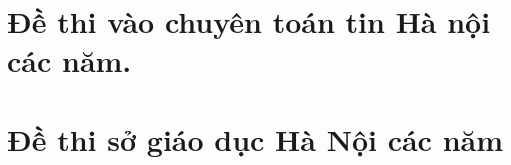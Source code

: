 \documentclass[12pt,a4paper,oneside]{book}
\begin{document}
\chapter{Đề thi vào chuyên toán tin Hà nội các năm.}

\newpage
\newpage
\newpage
\newpage
\newpage
\newpage
\newpage
\newpage
\chapter{Đề thi sở giáo dục Hà Nội các năm}

\newpage
\newpage
\newpage
\newpage
\newpage
\newpage
\newpage
\newpage
\newpage
\newpage
\newpage
\newpage
\end{document}
